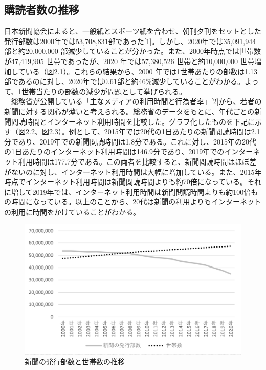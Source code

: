 \subsection{購読者数の推移}
日本新聞協会によると、一般紙とスポーツ紙を合わせ、朝刊夕刊をセットとした発行部数は2000年では53,708,831部であった[1]。しかし、2020年では35,091,944 部と約20,000,000 部減少していることが分かった。また、2000年時点では世帯数が47,419,905 世帯であったが、2020 年では57,380,526 世帯と約10,000,000 世帯増加している（図2.1）。これらの結果から、2000 年では1世帯あたりの部数は1.13部であるのに対し、2020年では0.61部と約46\%減少していることがわかる。よって、1世帯当たりの部数の減少が問題として挙げられる。\\
　総務省が公開している「主なメディアの利用時間と行為者率」[2]から、若者の新聞に対する関心が薄いと考えられる。総務省のデータをもとに、年代ごとの新聞閲読時間とインターネット利用時間を比較した。グラフ化したものを下記に示す（図2.2、図2.3）。例として、2015年では20代の1日あたりの新聞閲読時間は2.1分であり、2019年での新聞閲読時間は1.8分である。これに対し、2015年の20代の1日あたりのインターネット利用時間は146.9分であり、2019年でのインターネット利用時間は177.7分である。この両者を比較すると、新聞閲読時間はほぼ差がないのに対し、インターネット利用時間は大幅に増加している。また、2015年時点でインターネット利用時間は新聞閲読時間よりも約70倍になっている。それに増して2019年では、インターネット利用時間は新聞閲読時間よりも約100倍もの時間になっている。以上のことから、20代は新聞の利用よりもインターネットの利用に時間をかけていることがわかる。
\newpage
\begin{figure}[htbp]
    \centering
    \includegraphics[keepaspectratio, scale=0.5]{images/newspaper4.png}
    \caption{新聞の発行部数と世帯数の推移}
    \label{fig:my_label}
\end{figure}

